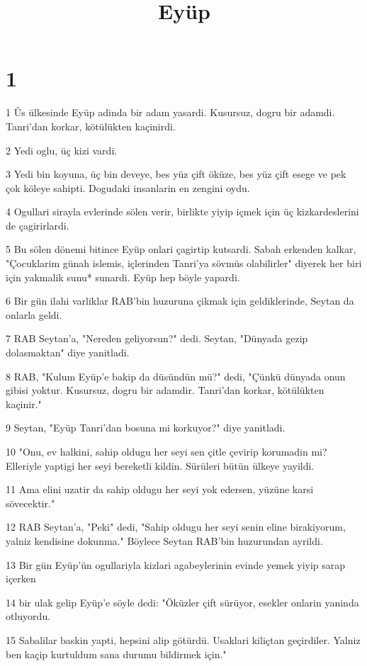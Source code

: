 

\title{Eyüp}


\chapter{1}

\par 1 Ûs ülkesinde Eyüp adinda bir adam yasardi. Kusursuz, dogru bir adamdi. Tanri'dan korkar, kötülükten kaçinirdi.
\par 2 Yedi oglu, üç kizi vardi.
\par 3 Yedi bin koyuna, üç bin deveye, bes yüz çift öküze, bes yüz çift esege ve pek çok köleye sahipti. Dogudaki insanlarin en zengini oydu.
\par 4 Ogullari sirayla evlerinde sölen verir, birlikte yiyip içmek için üç kizkardeslerini de çagirirlardi.
\par 5 Bu sölen dönemi bitince Eyüp onlari çagirtip kutsardi. Sabah erkenden kalkar, "Çocuklarim günah islemis, içlerinden Tanri'ya sövmüs olabilirler" diyerek her biri için yakmalik sunu* sunardi. Eyüp hep böyle yapardi.
\par 6 Bir gün ilahi varliklar RAB'bin huzuruna çikmak için geldiklerinde, Seytan da onlarla geldi.
\par 7 RAB Seytan'a, "Nereden geliyorsun?" dedi. Seytan, "Dünyada gezip dolasmaktan" diye yanitladi.
\par 8 RAB, "Kulum Eyüp'e bakip da düsündün mü?" dedi, "Çünkü dünyada onun gibisi yoktur. Kusursuz, dogru bir adamdir. Tanri'dan korkar, kötülükten kaçinir."
\par 9 Seytan, "Eyüp Tanri'dan bosuna mi korkuyor?" diye yanitladi.
\par 10 "Onu, ev halkini, sahip oldugu her seyi sen çitle çevirip korumadin mi? Elleriyle yaptigi her seyi bereketli kildin. Sürüleri bütün ülkeye yayildi.
\par 11 Ama elini uzatir da sahip oldugu her seyi yok edersen, yüzüne karsi sövecektir."
\par 12 RAB Seytan'a, "Peki" dedi, "Sahip oldugu her seyi senin eline birakiyorum, yalniz kendisine dokunma." Böylece Seytan RAB'bin huzurundan ayrildi.
\par 13 Bir gün Eyüp'ün ogullariyla kizlari agabeylerinin evinde yemek yiyip sarap içerken
\par 14 bir ulak gelip Eyüp'e söyle dedi: "Öküzler çift sürüyor, esekler onlarin yaninda otluyordu.
\par 15 Sabalilar baskin yapti, hepsini alip götürdü. Usaklari kiliçtan geçirdiler. Yalniz ben kaçip kurtuldum sana durumu bildirmek için."
